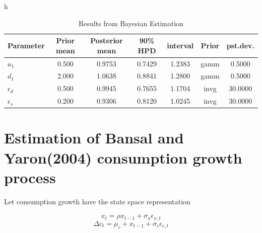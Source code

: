 \documentclass[a4paper,12pt]{scrartcl} %
\begin{document}
\begin{table}{h}
\centering
\caption{Results from Bayesian Estimation}\label{7}
\begin{tabular}{lcccccc}
\hline
Parameter&Prior mean&Posterior mean&90\% HPD&interval&Prior&pst.dev.\\
\hline
$a_1$&0.500&0.9753&0.7429&1.2383&gamm&0.5000\\
$d_1$&2.000&1.0638&0.8841&1.2800&gamm&0.5000\\
$\epsilon_d$&0.500&0.9945&0.7655&1.1704&invg&30.0000\\
$\epsilon_s$&0.200&0.9306&0.8120&1.0245&invg&30.0000\\
\hline
\end{tabular}
\end{table}

\vspace{4cm}

\section{Estimation of Bansal and Yaron(2004) consumption growth process}

Let consumption growth have the state space representation

$$x_t=\rho x_{t-1}+\sigma_x\epsilon_{x,t}$$
$$\Delta c_t=\mu_{c}+x_{t-1}+\sigma_c\epsilon_{c,t}$$
\end{document}
